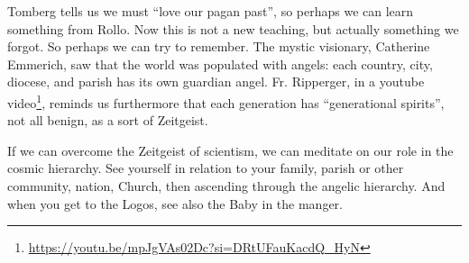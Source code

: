 Tomberg tells us we must “love our pagan past”, so perhaps we can learn something from Rollo. Now this is not a new
teaching, but actually something we forgot. So perhaps we can try to remember. The mystic visionary, Catherine
Emmerich, saw that the world was populated with angels: each country, city, diocese, and parish has its own guardian
angel. Fr. Ripperger, in a youtube video\footnote{\url{https://youtu.be/mpJgVAs02Dc?si=DRtUFauKacdQ_HyN}}, reminds us furthermore that each generation has “generational spirits”, not
all benign, as a sort of Zeitgeist.

If we can overcome the Zeitgeist of scientism, we can meditate on our role in the cosmic hierarchy. See yourself in
relation to your family, parish or other community, nation, Church, then ascending through the angelic hierarchy. And
when you get to the Logos, see also the Baby in the manger.

